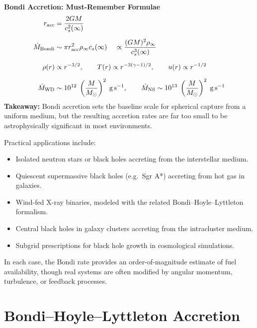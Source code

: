 \begin{bigidea}
\textbf{Bondi Accretion: Must-Remember Formulae}
\begin{align*}
r_{\rm acc} &= \frac{2GM}{c_s^2(\infty)} \\[6pt]
\dot{M}_{\rm Bondi} &\sim \pi r_{\rm acc}^2 \rho_\infty c_s(\infty) \;\;\;\; \propto \frac{(GM)^2 \rho_\infty}{c_s^3(\infty)} \\[6pt]
\rho(r) &\propto r^{-3/2}, \qquad T(r) \propto r^{-3(\gamma-1)/2}, \qquad u(r) \propto r^{-1/2} \\[6pt]
\dot{M}_{\rm WD} &\sim 10^{12} \;\left(\frac{M}{M_\odot}\right)^2\;{\rm g\,s^{-1}}, \qquad
\dot{M}_{\rm NS} \sim 10^{13} \;\left(\frac{M}{M_\odot}\right)^2\;{\rm g\,s^{-1}}
\end{align*}
\textbf{Takeaway:} Bondi accretion sets the baseline scale for spherical capture from a uniform medium, but the resulting accretion rates are far too small to be astrophysically significant in most environments.
\end{bigidea}

\begin{conceptbox}

Practical applications include:
\begin{itemize}
    \item Isolated neutron stars or black holes accreting from the interstellar medium.
    \item Quiescent supermassive black holes (e.g.\ Sgr A*) accreting from hot gas in galaxies.
    \item Wind-fed X-ray binaries, modeled with the related Bondi--Hoyle--Lyttleton formalism.
    \item Central black holes in galaxy clusters accreting from the intracluster medium.
    \item Subgrid prescriptions for black hole growth in cosmological simulations.
\end{itemize}
In each case, the Bondi rate provides an order-of-magnitude estimate of fuel availability, 
though real systems are often modified by angular momentum, turbulence, or feedback processes.
\end{conceptbox}

\section{Bondi--Hoyle--Lyttleton Accretion}
\label{sec:BHL}

